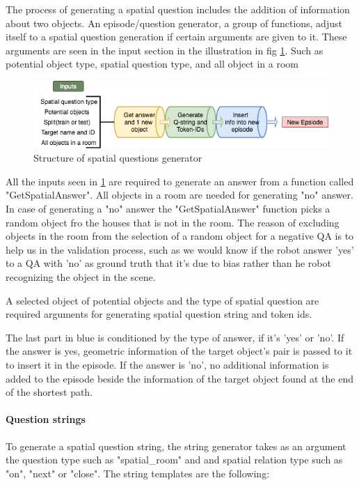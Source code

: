 The process of generating a spatial question includes the addition of information about two objects. An episode/question generator, a group of functions, adjust itself to a spatial question generation if certain arguments are given to it. These arguments are seen in the input section  in the illustration in fig \ref{fig:spatialGen}. Such as potential  object type, spatial question type, and all object in a room 

\begin{figure}[h]
\includegraphics[scale=0.4]{images/spatialGenerator.png} %
\caption{Structure of spatial questions generator}
\label{fig:spatialGen}
\end{figure}

All the inputs seen in \ref{fig:spatialGen} are required to generate an answer from a function called "GetSpatialAnswer". All objects in a room are needed for generating "no" answer. In case of generating a "no" answer the "GetSpatialAnswer" function picks a random object fro the houses that is not in the room. The reason of excluding objects in the room from the selection of a random object for a negative QA is to help us in the validation process, such as we would know if the robot answer 'yes' to a QA with 'no' as ground truth that it's due to bias rather than he robot recognizing the object in the scene. 

A selected object of potential objects and the type of spatial question are required arguments for generating spatial question string and token ids. 

The last part in blue is conditioned by the type of answer, if it's 'yes' or 'no'. If the answer is yes, geometric information of the target object's pair is passed to it to insert it in the episode. If the answer is 'no', no additional information is added to the episode beside the information of the target object found at the end of the shortest path. 
\paragraph{Question strings}

To generate a spatial question string, the string generator takes as an argument the question type such as "spatial\_room" and and spatial relation type such as "on", "next" or "close". The string templates are the following: 

